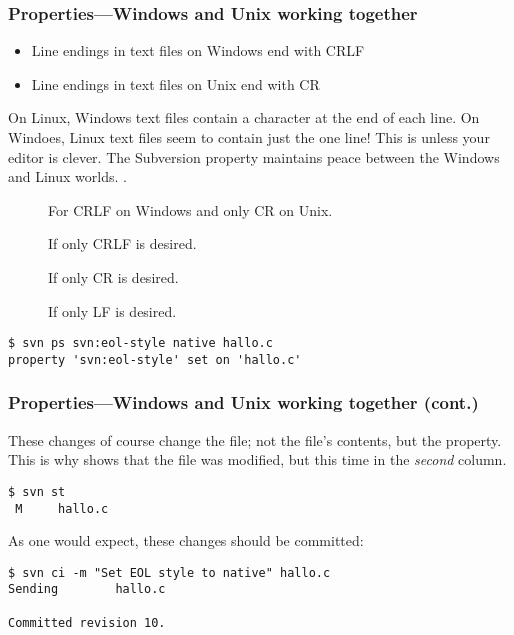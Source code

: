 \begin{frame}[fragile]
    \frametitle{Properties---Windows and Unix working together}
    \linuxframe

    \begin{itemize}
        \item Line endings in text files on Windows end with CRLF
        \item Line endings in text files on Unix end with CR
    \end{itemize}

    On Linux, Windows text files contain a  character at the
    end of each line.  On Windoes, Linux text files seem to contain just the
    one line!  This is unless your editor is clever.  The
     Subversion property maintains peace between the
    Windows and Linux worlds.
    .

    \begin{description}
        \item[] For CRLF on Windows and only
            CR on Unix.
        \item[] If only CRLF is desired.
        \item[] If only CR is desired.
        \item[] If only LF is desired.
\end{description}

\begin{lstlisting}
$ svn ps svn:eol-style native hallo.c
property 'svn:eol-style' set on 'hallo.c'
\end{lstlisting}
\end{frame}

\begin{frame}[fragile]
    \frametitle{Properties---Windows and Unix working together (cont.)}
    \linuxframe

    These changes of course change the file; not the file's contents, but
    the property.  This is why  shows that the file was
    modified, but this time in the \emph{second} column.

\begin{lstlisting}
$ svn st
 M     hallo.c
\end{lstlisting}

    As one would expect, these changes should be committed:
\begin{lstlisting}
$ svn ci -m "Set EOL style to native" hallo.c
Sending        hallo.c

Committed revision 10.
\end{lstlisting}
\end{frame}

